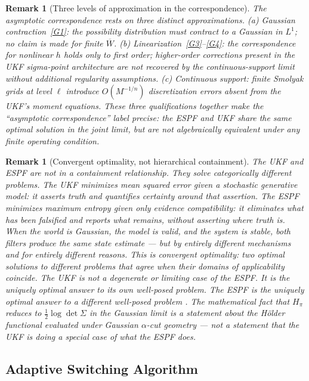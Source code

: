 \documentclass[12pt]{article}
\newtheorem{remark}[theorem]{Remark}
\begin{document}
\begin{remark}[Three levels of approximation in the correspondence]
\label{rem:three_levels}
The asymptotic correspondence rests on three distinct approximations.
\emph{(a) Gaussian contraction}~\eqref{G1}: the possibility distribution must
contract to a Gaussian in $L^1$; no claim is made for finite $\overline{W}$.
\emph{(b) Linearization}~\eqref{G3}--\eqref{G4}: the correspondence for
nonlinear $h$ holds only to first order; higher-order corrections present in
the UKF sigma-point architecture are not recovered by the continuous-support
limit without additional regularity assumptions.
\emph{(c) Continuous support}: finite Smolyak grids at level $\ell$ introduce
$O(M^{-1/n})$ discretization errors absent from the UKF's moment equations.
These three qualifications together make the ``asymptotic correspondence'' label
precise: the ESPF and UKF share the same optimal solution in the joint limit,
but are not algebraically equivalent under any finite operating condition.
\end{remark}

\begin{remark}[Convergent optimality, not hierarchical containment]
The UKF and ESPF are not in a containment relationship. They solve categorically
different problems. The UKF minimizes mean squared error given a stochastic generative
model: it asserts truth and quantifies certainty around that assertion. The ESPF minimizes
maximum entropy given only evidence compatibility: it eliminates what has been falsified
and reports what remains, without asserting where truth is. When the world is Gaussian,
the model is valid, and the system is stable, both filters produce the same state estimate
--- but by entirely different mechanisms and for entirely different reasons. This is
convergent optimality: two optimal solutions to different problems that agree when their
domains of applicability coincide. The UKF is not a degenerate or limiting case of the
ESPF. It is the uniquely optimal answer to its own well-posed problem. The ESPF is the
uniquely optimal answer to a different well-posed problem \cite{jah2026optimality}. The
mathematical fact that $H_\pi$ reduces to $\frac{1}{2}\log\det\Sigma$ in the Gaussian
limit is a statement about the H\"{o}lder functional evaluated under Gaussian
$\alpha$-cut geometry --- not a statement that the UKF is doing a special case of what
the ESPF does.
\end{remark}

\subsection{Adaptive Switching Algorithm}
\end{document}
